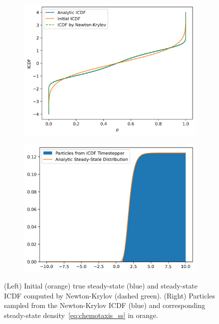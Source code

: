 \documentclass{article}
\begin{document}
\begin{figure}[h]
    \centering
    \begin{subfigure}[b]{0.51\textwidth}
        \centering
        \includegraphics[width=\textwidth]{figures/ChemotaxisICDF.png}
    \end{subfigure}%
    \begin{subfigure}[b]{0.51\textwidth}
        \centering
        \includegraphics[width=\textwidth]{figures/ParticlesChemotaxisICDF.png}
    \end{subfigure}
    \caption{(Left) Initial (orange) true steady-state (blue) and steady-state ICDF computed by Newton-Krylov (dashed green). (Right) Particles sampled from the Newton-Krylov ICDF (blue) and corresponding steady-state density~\eqref{eq:chemotaxis_ss} in orange.}
    \label{fig:chemotaxis_icdf}
\end{figure}
\end{document}
